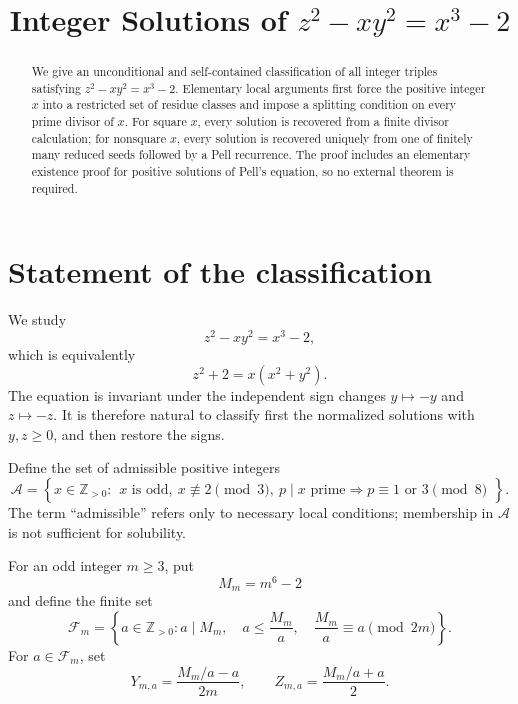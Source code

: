 \documentclass[11pt,a4paper]{amsart}
\title{Integer Solutions of \texorpdfstring{$z^2-xy^2=x^3-2$}{z2 - xy2 = x3 - 2}}
\author{}
\date{}
\theoremstyle{definition}
\newcommand{\Z}{\mathbb Z}
\newcommand{\Acal}{\mathcal A}
\newcommand{\Fcal}{\mathcal F}
\numberwithin{equation}{section}
\begin{document}
\begin{abstract}
We give an unconditional and self-contained classification of all integer triples satisfying
\(z^2-xy^2=x^3-2\).
Elementary local arguments first force the positive integer \(x\) into a restricted set of residue classes and impose a splitting condition on every prime divisor of \(x\).
For square \(x\), every solution is recovered from a finite divisor calculation; for nonsquare \(x\), every solution is recovered uniquely from one of finitely many reduced seeds followed by a Pell recurrence.
The proof includes an elementary existence proof for positive solutions of Pell's equation, so no external theorem is required.
\end{abstract}

\maketitle

\section{Statement of the classification}

We study
\begin{equation}
 z^2-xy^2=x^3-2,
 \label{eq:main}
\end{equation}
which is equivalently
\begin{equation}
 z^2+2=x(x^2+y^2).
 \label{eq:norm-form}
\end{equation}
The equation is invariant under the independent sign changes \(y\mapsto-y\) and
\(z\mapsto-z\).  It is therefore natural to classify first the normalized solutions
with \(y,z\geq0\), and then restore the signs.

Define the set of admissible positive integers
\begin{equation}
 \Acal=
 \left\{
 x\in\Z_{>0}:
 \begin{array}{l}
 x\text{ is odd},\
 x\not\equiv2\pmod 3,\
 p\mid x\text{ prime}\Longrightarrow p\equiv1\text{ or }3\pmod 8
 \end{array}
 \right\}.
 \label{eq:admissible}
\end{equation}
The term ``admissible'' refers only to necessary local conditions; membership in
\(\Acal\) is not sufficient for solubility.

For an odd integer \(m\geq3\), put
\begin{equation}
 M_m=m^6-2
 \label{eq:Mm}
\end{equation}
and define the finite set
\begin{equation}
 \Fcal_m=
 \left\{
 a\in\Z_{>0}:
 a\mid M_m,\quad
 a\leq \frac{M_m}{a},\quad
 \frac{M_m}{a}\equiv a\pmod{2m}
 \right\}.
 \label{eq:Fm}
\end{equation}
For \(a\in\Fcal_m\), set
\begin{equation}
 Y_{m,a}=\frac{M_m/a-a}{2m},
 \qquad
 Z_{m,a}=\frac{M_m/a+a}{2}.
 \label{eq:squareYZ}
\end{equation}
\end{document}
